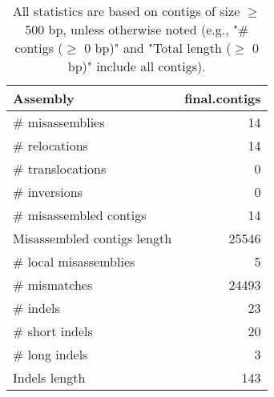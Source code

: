 \documentclass[12pt,a4paper]{article}
\begin{document}
\begin{table}[ht]
\begin{center}
\caption{All statistics are based on contigs of size $\geq$ 500 bp, unless otherwise noted (e.g., "\# contigs ($\geq$ 0 bp)" and "Total length ($\geq$ 0 bp)" include all contigs).}
\begin{tabular}{|l*{1}{|r}|}
\hline
Assembly & final.contigs \\ \hline
\# misassemblies & 14 \\ \hline
\hspace{5mm}\# relocations & 14 \\ \hline
\hspace{5mm}\# translocations & 0 \\ \hline
\hspace{5mm}\# inversions & 0 \\ \hline
\# misassembled contigs & 14 \\ \hline
Misassembled contigs length & 25546 \\ \hline
\# local misassemblies & 5 \\ \hline
\# mismatches & 24493 \\ \hline
\# indels & 23 \\ \hline
\hspace{5mm}\# short indels & 20 \\ \hline
\hspace{5mm}\# long indels & 3 \\ \hline
Indels length & 143 \\ \hline
\end{tabular}
\end{center}
\end{table}
\end{document}
